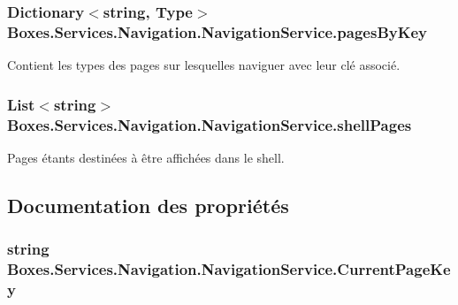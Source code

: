 \subsubsection[{\texorpdfstring{pages\+By\+Key}{pagesByKey}}]{\setlength{\rightskip}{0pt plus 5cm}Dictionary$<$string, Type$>$ Boxes.\+Services.\+Navigation.\+Navigation\+Service.\+pages\+By\+Key\hspace{0.3cm}{\ttfamily [private]}}\hypertarget{class_boxes_1_1_services_1_1_navigation_1_1_navigation_service_ab47e2610acc4784083f0fc7706653b18}{}\label{class_boxes_1_1_services_1_1_navigation_1_1_navigation_service_ab47e2610acc4784083f0fc7706653b18}


Contient les types des pages sur lesquelles naviguer avec leur clé associé. 

\subsubsection[{\texorpdfstring{shell\+Pages}{shellPages}}]{\setlength{\rightskip}{0pt plus 5cm}List$<$string$>$ Boxes.\+Services.\+Navigation.\+Navigation\+Service.\+shell\+Pages\hspace{0.3cm}{\ttfamily [private]}}\hypertarget{class_boxes_1_1_services_1_1_navigation_1_1_navigation_service_af210b37736b21117084b53510c225b89}{}\label{class_boxes_1_1_services_1_1_navigation_1_1_navigation_service_af210b37736b21117084b53510c225b89}


Pages étants destinées à être affichées dans le shell. 



\subsection{Documentation des propriétés}
\subsubsection[{\texorpdfstring{Current\+Page\+Key}{CurrentPageKey}}]{\setlength{\rightskip}{0pt plus 5cm}string Boxes.\+Services.\+Navigation.\+Navigation\+Service.\+Current\+Page\+Key\hspace{0.3cm}{\ttfamily [get]}}\hypertarget{class_boxes_1_1_services_1_1_navigation_1_1_navigation_service_ab080fe0a7b5e990934e11b55a03bbf28}{}\label{class_boxes_1_1_services_1_1_navigation_1_1_navigation_service_ab080fe0a7b5e990934e11b55a03bbf28}


